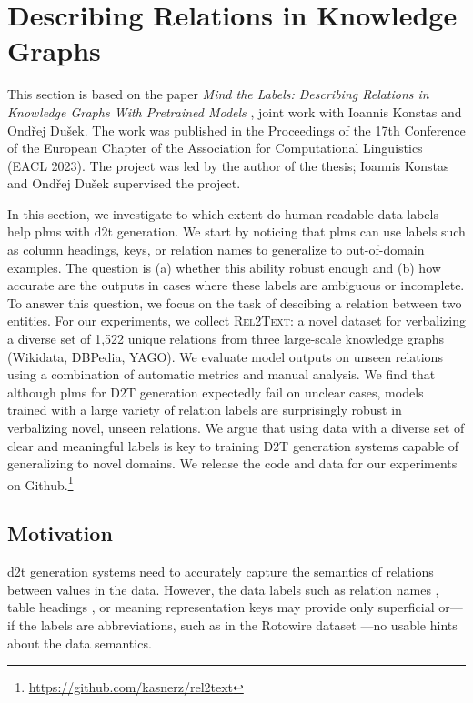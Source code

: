 \section{Describing Relations in Knowledge Graphs}
\label{sec:rel2text}
\begin{refbox}
    This section is based on the paper \emph{Mind the Labels: Describing Relations in Knowledge Graphs With Pretrained Models} \cite{kasnerMindLabelsDescribing2022}, joint work with Ioannis Konstas and Ondřej Dušek. The work was published in the Proceedings of the 17th Conference of the European Chapter of the Association for Computational Linguistics (EACL 2023). The project was led by the author of the thesis; Ioannis Konstas and Ondřej Dušek supervised the project.
\end{refbox}
In this section, we investigate to which extent do human-readable data labels help \acp{plm} with \ac{d2t} generation. We start by noticing that \acp{plm} can use labels such as column headings, keys, or relation names to generalize to out-of-domain examples. The question is (a) whether this ability robust enough and (b) how accurate are the outputs in cases where these labels are ambiguous or incomplete. To answer this question, we focus on the task of descibing a relation between two entities. For our experiments, we collect \textsc{Rel2Text}: a novel dataset for verbalizing a diverse set of 1,522 unique relations from three large-scale knowledge graphs (Wikidata, DBPedia, YAGO). We evaluate model outputs on unseen relations using a combination of automatic metrics and manual analysis. We find that although \acp{plm} for D2T generation expectedly fail on unclear cases, models trained with a large variety of relation labels are surprisingly robust in verbalizing novel, unseen relations. We argue that using data with a diverse set of clear and meaningful labels is key to training D2T generation systems capable of generalizing to novel domains. We release the code and data for our experiments on Github.\footnote{\url{https://github.com/kasnerz/rel2text}}


% 

\subsection{Motivation}
\ac{d2t} generation systems need to accurately capture the semantics of relations between values in the data. However, the data labels such as relation names \cite{farber2018linked,haller2022analysis}, table headings \cite{parikhToTToControlledTableToText2020}, or meaning representation keys \cite{dusekEvaluatingStateoftheartEndtoEnd2020} may provide only superficial or---if the labels are abbreviations, such as in the Rotowire dataset \cite{wiseman2017challenges}---no usable hints about the data semantics.


